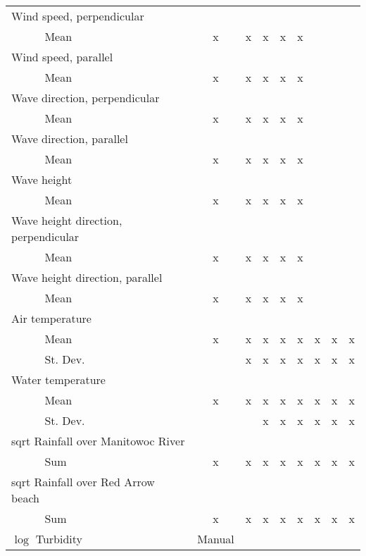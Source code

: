 \begin{table}
{\begin{minipage}{\textwidth}
\begin{tabular}{ll|cccccccc}
        \hline
        \multicolumn{2}{l|}{Wind speed, perpendicular} &&&&&&&& \\
        & Mean & x & x & x & x & x & & & \\
        \hline
        \multicolumn{2}{l|}{Wind speed, parallel} &&&&&&&& \\
        & Mean & x & x & x & x & x & & & \\
        \hline
        \multicolumn{2}{l|}{Wave direction, perpendicular} &&&&&&&& \\
        & Mean & x & x & x & x & x & & & \\
        \hline
        \multicolumn{2}{l|}{Wave direction, parallel} &&&&&&&& \\
        & Mean & x & x & x & x & x & & & \\
        \hline
        \multicolumn{2}{l|}{Wave height} &&&&&&&& \\
        & Mean & x & x & x & x & x & & & \\
        \hline
        \multicolumn{2}{l|}{Wave height direction, perpendicular} &&&&&&&& \\
        & Mean & x & x & x & x & x & & & \\
        \hline
        \multicolumn{2}{l|}{Wave height direction, parallel} &&&&&&&& \\
        & Mean & x & x & x & x & x & & & \\
        \hline
        \multicolumn{2}{l|}{Air temperature} &&&&&&&& \\
        & Mean & x & x & x & x & x & x & x & x \\
        & St. Dev. & & x & x & x & x & x & x & x \\
        \hline
        \multicolumn{2}{l|}{Water temperature} &&&&&&&& \\
        & Mean & x & x & x & x & x & x & x & x \\
        & St. Dev. & & & x & x & x & x & x & x \\
        \hline
        \multicolumn{2}{l|}{sqrt Rainfall over Manitowoc River} &&&&&&&& \\
        & Sum & x & x & x & x & x & x & x & x \\
        \hline
        \multicolumn{2}{l|}{sqrt Rainfall over Red Arrow beach} &&&&&&&& \\
        & Sum & x & x & x & x & x & x & x & x \\
        \hline
        \multicolumn{2}{l|}{$\log$ Turbidity} & Manual&&&&&&& \\
        \hline

\end{tabular}
\end{minipage}}
\end{table}
